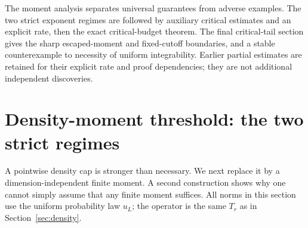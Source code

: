 \documentclass[11pt]{article}
\begin{document}
The moment analysis separates universal guarantees from adverse examples.
The two strict exponent regimes are followed by auxiliary critical estimates
and an explicit rate, then the exact critical-budget theorem. The final
critical-tail section gives the sharp escaped-moment and fixed-cutoff
boundaries, and a stable
counterexample to necessity of uniform integrability. Earlier partial
estimates are retained for their explicit rate and proof dependencies;
they are not additional independent discoveries.

\section{Density-moment threshold: the two strict regimes}
\label{sec:finite-moment}
A pointwise density cap is stronger than necessary. We next replace it
by a dimension-independent finite moment. A second construction shows why
one cannot simply assume that any finite moment suffices. All norms in
this section use the uniform probability law $u_L$; the operator is the
same $T_r$ as in Section~\ref{sec:density}.
\end{document}
